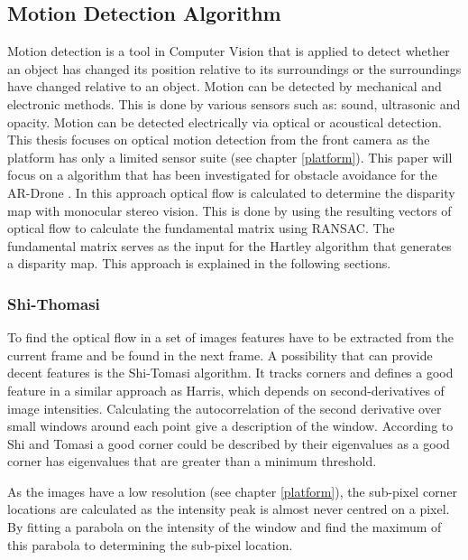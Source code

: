 \documentclass[a4paper]{article}
\begin{document}
\subsection{Motion Detection Algorithm}
Motion detection is a tool in Computer Vision that is applied to detect whether an object has changed its position relative to its surroundings or the surroundings have changed relative to an object. Motion can be detected by mechanical and electronic methods. This is done by various sensors such as: sound, ultrasonic and opacity. Motion can be detected electrically via optical or acoustical detection. This thesis focuses on optical motion detection from the front camera as the platform has only a limited sensor suite (see chapter \ref{platform}). This paper will focus on a algorithm that has been investigated for obstacle avoidance for the AR-Drone \cite{Jurriaans2011}. In this approach optical flow is calculated to determine the disparity map with monocular stereo vision. This is done by using the resulting vectors of optical flow to calculate the fundamental matrix using RANSAC. The fundamental matrix serves as the input for the Hartley algorithm that generates a disparity map. This approach is explained in the following sections.

\subsubsection{Shi-Thomasi}
To find the optical flow in a set of images features have to be extracted from the current frame and be found in the next frame. A possibility that can provide decent features is the Shi-Tomasi algorithm. It tracks corners and defines a good feature in a similar approach as Harris, which depends on second-derivatives of image intensities. Calculating the autocorrelation of the second derivative over small windows around each point give a description of the window. According to Shi and Tomasi a good corner could be described by their eigenvalues as a good corner has eigenvalues that are greater than a minimum threshold.

As the images have a low resolution (see chapter \ref{platform}), the sub-pixel corner locations are calculated as the intensity peak is almost never centred on a pixel. By fitting a parabola on the intensity of the window and find the maximum of this parabola to determining the sub-pixel location.
\end{document}
